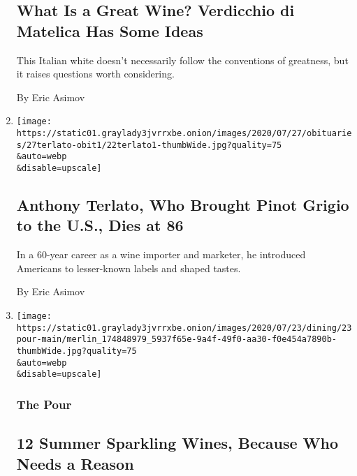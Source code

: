 \begin{enumerate}
  \hypertarget{what-is-a-great-wine-verdicchio-di-matelica-has-some-ideas}{%
  \subsection{What Is a Great Wine? Verdicchio di Matelica Has Some
  Ideas}\label{what-is-a-great-wine-verdicchio-di-matelica-has-some-ideas}}

  This Italian white doesn't necessarily follow the conventions of
  greatness, but it raises questions worth considering.

  By Eric Asimov
\item
  \href{/2020/07/23/dining/drinks/anthony-terlato-dead.html}{}

  \texttt{[image: https://static01.graylady3jvrrxbe.onion/images/2020/07/27/obituaries/27terlato-obit1/22terlato1-thumbWide.jpg?quality=75\\\&auto=webp\\\&disable=upscale]}

  \hypertarget{anthony-terlato-who-brought-pinot-grigio-to-the-us-dies-at-86}{%
  \subsection{Anthony Terlato, Who Brought Pinot Grigio to the U.S.,
  Dies at
  86}\label{anthony-terlato-who-brought-pinot-grigio-to-the-us-dies-at-86}}

  In a 60-year career as a wine importer and marketer, he introduced
  Americans to lesser-known labels and shaped tastes.

  By Eric Asimov
\item
  \href{/2020/07/23/dining/drinks/best-sparkling-wines.html}{}

  \texttt{[image: https://static01.graylady3jvrrxbe.onion/images/2020/07/23/dining/23pour-main/merlin\_174848979\_5937f65e-9a4f-49f0-aa30-f0e454a7890b-thumbWide.jpg?quality=75\\\&auto=webp\\\&disable=upscale]}

  \hypertarget{the-pour-3}{%
  \subsubsection{The Pour}\label{the-pour-3}}

  \hypertarget{12-summer-sparkling-wines-because-who-needs-a-reason}{%
  \subsection{12 Summer Sparkling Wines, Because Who Needs a
  Reason}\label{12-summer-sparkling-wines-because-who-needs-a-reason}}


\end{enumerate}
